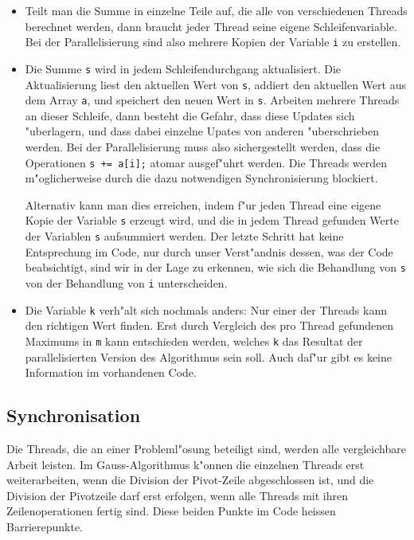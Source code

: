\begin{itemize}
\item
Teilt man die Summe in einzelne Teile auf, die alle von verschiedenen
Threads berechnet werden, dann braucht jeder Thread seine eigene 
Schleifenvariable.
Bei der Parallelisierung sind also mehrere Kopien der Variable {\tt i} zu
erstellen.
\item
Die Summe {\tt s} wird in jedem Schleifendurchgang aktualisiert.
Die Aktualisierung liest den aktuellen Wert von {\tt s}, addiert
den aktuellen Wert aus dem Array {\tt a}, und speichert den neuen Wert
in {\tt s}.
Arbeiten mehrere Threads an dieser Schleife, dann besteht die Gefahr,
dass diese Updates sich "uberlagern, und dass dabei einzelne Upates
von anderen "uberschrieben werden.
Bei der Parallelisierung muss also sichergestellt werden, dass die
Operationen \verb/s += a[i];/ atomar ausgef"uhrt werden.
Die Threads werden m"oglicherweise durch die dazu notwendigen Synchronisierung
blockiert.

Alternativ kann man dies erreichen, indem f"ur jeden Thread eine eigene
Kopie der Variable {\tt s} erzeugt wird, und die in jedem Thread
gefunden Werte der Variablen {\tt s} aufsummiert werden.
Der letzte Schritt hat keine Entsprechung im Code, nur durch unser
Verst"andnis dessen, was der Code beabsichtigt, sind wir in der Lage
zu erkennen, wie sich die Behandlung von {\tt s} von der Behandlung
von {\tt i} unterscheiden.
\item
Die Variable {\tt k} verh"alt sich nochmals anders:
Nur einer der Threads kann den richtigen Wert finden.
Erst durch Vergleich des pro Thread gefundenen Maximums in {\tt m}
kann entschieden werden, welches {\tt k} das Resultat der
parallelisierten Version des Algorithmus sein soll.
Auch daf"ur gibt es keine Information im vorhandenen Code.
\end{itemize}

\subsection{Synchronisation}
Die Threads, die an einer Probleml"osung beteiligt sind, werden alle
vergleichbare Arbeit leisten. 
Im Gauss-Algorithmus k"onnen die einzelnen Threads erst weiterarbeiten,
wenn die Division der Pivot-Zeile abgeschlossen ist, und die Division
der Pivotzeile darf erst erfolgen,
wenn alle Threads mit ihren Zeilenoperationen fertig sind.
Diese beiden Punkte im Code heissen Barrierepunkte.

